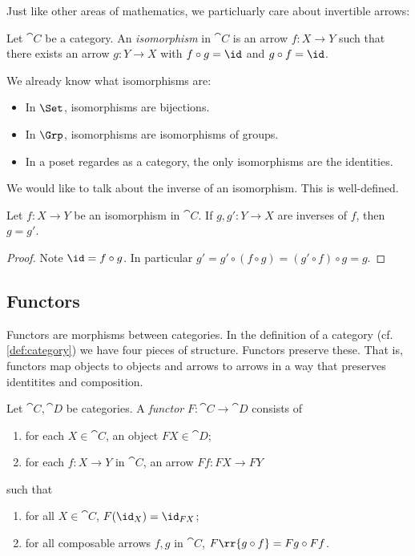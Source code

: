 \documentclass{article}
\begin{document}
Just like other areas of mathematics, we particluarly care about invertible
arrows:

\begin{definition}
  Let $\cat{C}$ be a category. An \emph{isomorphism} in $\cat{C}$ is an arrow
  $f:X\to Y$ such that there exists an arrow $g:Y\to X$ with $f\circ g = \id$
  and $g\circ f = \id$.
\end{definition}

\begin{example}
  We already know what isomorphisms are:
  \begin{itemize}
    \item In $\Set$, isomorphisms are bijections.
    \item In $\Grp$, isomorphisms are isomorphisms of groups.
    \item In a poset regardes as a category, the only isomorphisms are the
      identities.
  \end{itemize}
\end{example}

We would like to talk about the inverse of an isomorphism. This is well-defined.

\begin{proposition}\label{prop:inverses_are_unique}
  Let $f:X\to Y$ be an isomorphism in $\cat{C}$. If $g,g':Y\to X$ are inverses of
  $f$, then $g=g'$.
  \begin{proof}
    Note $\id=f\circ g$. In particular $g'=g'\circ(f\circ g) = (g'\circ f)\circ g=g$.
  \end{proof}
\end{proposition}

\subsection{Functors}

Functors are morphisms between categories. In the definition of a category (cf.
\ref{def:category}) we have four pieces of structure. Functors preserve these.
That is, functors map objects to objects and arrows to arrows in a way that
preserves identitites and composition.

\begin{definition}\label{def:functor}
  Let $\cat{C},\cat{D}$ be categories. A \emph{functor} $F:\cat{C}\to\cat{D}$
  consists of
  \begin{enumerate}
    \item for each $X\in\cat{C}$, an object $FX\in\cat{D}$;
    \item for each $f:X\to Y$ in $\cat{C}$, an arrow $Ff:FX\to FY$
  \end{enumerate}
  such that
  \begin{enumerate}
    \item for all $X\in\cat{C}$, $F(\id_X)=\id_{FX}$;
    \item for all composable arrows $f,g$ in $\cat{C}$, $F\rr{g\circ f}=Fg\circ Ff$.
  \end{enumerate}
\end{definition}
\end{document}
